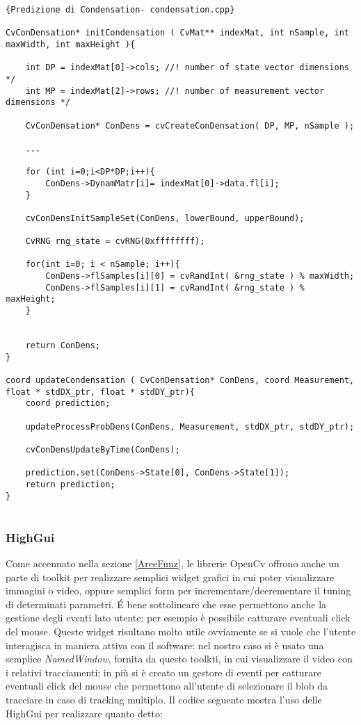 \lstset{language=c++}
\lstset{commentstyle=\emph}
\begin{lstlisting}[frame=r,caption=Predizione di Condensation- condensation.cpp ,breaklines=true,basicstyle=\small]{Predizione di Condensation- condensation.cpp}

CvConDensation* initCondensation ( CvMat** indexMat, int nSample, int maxWidth, int maxHeight ){
	
	int DP = indexMat[0]->cols; //! number of state vector dimensions */
	int MP = indexMat[2]->rows; //! number of measurement vector dimensions */

	CvConDensation* ConDens = cvCreateConDensation( DP, MP, nSample );
	
	...

	for (int i=0;i<DP*DP;i++){
		ConDens->DynamMatr[i]= indexMat[0]->data.fl[i];
	}

	cvConDensInitSampleSet(ConDens, lowerBound, upperBound);
	
	CvRNG rng_state = cvRNG(0xffffffff);
	
	for(int i=0; i < nSample; i++){
		ConDens->flSamples[i][0] = cvRandInt( &rng_state ) % maxWidth;
		ConDens->flSamples[i][1] = cvRandInt( &rng_state ) % maxHeight;
	}

	
	return ConDens;
}

coord updateCondensation ( CvConDensation* ConDens, coord Measurement, float * stdDX_ptr, float * stdDY_ptr){
	coord prediction;
	
	updateProcessProbDens(ConDens, Measurement, stdDX_ptr, stdDY_ptr);
	
	cvConDensUpdateByTime(ConDens);
	
	prediction.set(ConDens->State[0], ConDens->State[1]);
	return prediction;	
}


\end{lstlisting}

\newpage
\subsubsection{HighGui}
Come accennato nella sezione \ref{AreeFunz}, le librerie OpenCv offrono anche un parte di toolkit per realizzare semplici widget grafici in cui poter visualizzare immagini o video, oppure semplici form per incrementare/decrementare il tuning di determinati parametri. \'E bene sottolineare che esse permettono anche la gestione degli eventi lato utente; per esempio è possibile catturare eventuali click del mouse. Queste widget risultano molto utile ovviamente se si vuole che l'utente interagisca in maniera attiva con il software: nel nostro caso si è usato una semplice \textit{NamedWindow}, fornita da questo toolkti, in cui visualizzare il video con i relativi tracciamenti; in più si è creato un gestore di eventi per catturare eventuali click del mouse che permettono all'utente di selezionare il blob da tracciare in caso di tracking multiplo.
Il codice seguente mostra l'uso delle HighGui per realizzare quanto detto:

